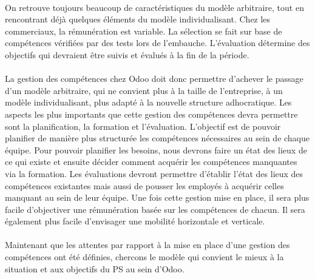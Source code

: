 \paragraph{} On retrouve toujours beaucoup de caractéristiques du modèle arbitraire, tout en rencontrant déjà quelques éléments du modèle individualisant. Chez les commerciaux, la rémunération est variable. La sélection se fait sur base de compétences vérifiées par des tests lors de l'embauche. L'évaluation détermine des objectifs qui devraient être suivis et évalués à la fin de la période.


\paragraph{} La gestion des compétences chez Odoo doit donc permettre d'achever le passage d'un modèle arbitraire, qui ne convient plus à la taille de l'entreprise, à un modèle individualisant, plus adapté à la nouvelle structure adhocratique. Les aspects les plus importants que cette gestion des compétences devra permettre sont la planification, la formation et l'évaluation. L'objectif est de pouvoir planifier de manière plus structurée les compétences nécessaires au sein de chaque équipe. Pour pouvoir planifier les besoins, nous devrons faire un état des lieux de ce qui existe et ensuite décider comment acquérir les compétences manquantes via la formation. Les évaluations devront permettre d'établir l'état des lieux des compétences existantes mais aussi de pousser les employés à acquérir celles manquant au sein de leur équipe. Une fois cette gestion mise en place, il sera plus facile d'objectiver une rémunération basée sur les compétences de chacun. Il sera également plus facile d'envisager une mobilité horizontale et verticale.

\paragraph{} Maintenant que les attentes par rapport à la mise en place d'une gestion des compétences ont été définies, chercons le modèle qui convient le mieux à la situation et aux objectifs du PS au sein d'Odoo.





